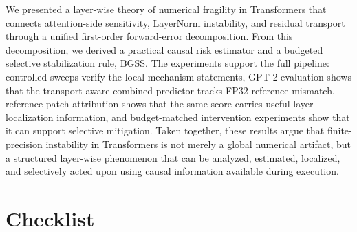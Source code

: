 \documentclass[twoside]{article}
\theoremstyle{definition}
\theoremstyle{remark}
\begin{document}
We presented a layer-wise theory of numerical fragility in Transformers that
connects attention-side sensitivity, LayerNorm instability, and residual
transport through a unified first-order forward-error decomposition. From this
decomposition, we derived a practical causal risk estimator and a budgeted
selective stabilization rule, BGSS. The experiments support the full pipeline:
controlled sweeps verify the local mechanism statements, GPT-2 evaluation shows
that the transport-aware combined predictor tracks FP32-reference mismatch,
reference-patch attribution shows that the same score carries useful
layer-localization information, and budget-matched intervention experiments
show that it can support selective mitigation. Taken together, these results
argue that finite-precision instability in Transformers is not merely a global
numerical artifact, but a structured layer-wise phenomenon that can be
analyzed, estimated, localized, and selectively acted upon using causal
information available during execution.


\newpage




\newpage

\section*{Checklist}
\end{document}
